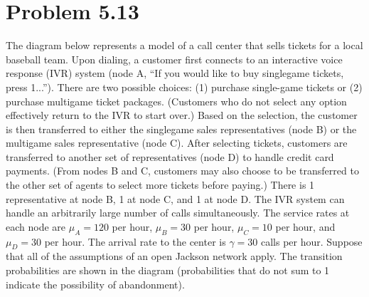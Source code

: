 \documentclass[letterpaper]{amsart}
\begin{document}
\section{Problem 5.13} %
The diagram below represents a model of a call center that sells tickets for a
local baseball team. Upon dialing, a customer first connects to an interactive
voice response (IVR) system (node A, ``If you would like to buy singlegame
tickets, press 1...''). There are two possible choices: (1) purchase
single-game tickets or (2) purchase multigame ticket packages. (Customers who do
not select any option effectively return to the IVR to start over.) Based on the
selection, the customer is then transferred to either the singlegame sales
representatives (node B) or the multigame sales representative (node C). After
selecting tickets, customers are transferred to another set of representatives
(node D) to handle credit card payments. (From nodes B and C, customers may also
choose to be transferred to the other set of agents to select more tickets
before paying.) There is 1 representative at node B, 1 at node C, and 1 at node
D. The IVR system can handle an arbitrarily large number of calls
simultaneously. The service rates at each node are $\mu_A = 120$ per hour, $\mu_B = 30$
per hour, $\mu_C = 10$ per hour, and $\mu_D = 30$ per hour. The arrival rate to the center
is $\gamma = 30$ calls per hour. Suppose that all of the assumptions of an open
Jackson network apply. The transition probabilities are shown in the diagram
(probabilities that do not sum to 1 indicate the possibility of abandonment).
\begin{figure}[H]
\end{figure}
\end{document}
